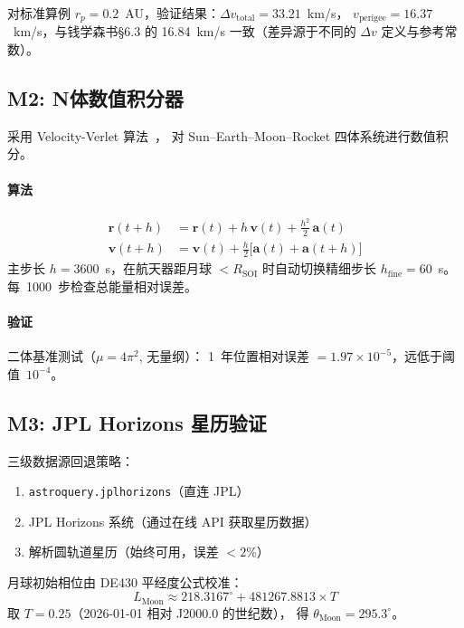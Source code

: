 \documentclass[a4paper,12pt]{article}
\begin{document}
对标准算例 $r_p = 0.2$~AU，验证结果：$\Delta v_{\mathrm{total}} = 33.21$~km/s，
$v_{\mathrm{perigee}} = 16.37$~km/s，与钱学森书\S6.3 的 16.84~km/s 一致（差异源于不同的
$\Delta v$ 定义与参考常数）。

\subsection{M2: N体数值积分器}\label{sec:m2}

采用 Velocity-Verlet 算法~\cite{verlet1967}，
对 Sun--Earth--Moon--Rocket 四体系统进行数值积分。

\paragraph{算法}
\begin{equation}\label{eq:verlet}
  \begin{aligned}
    \mathbf{r}(t+h) &= \mathbf{r}(t) + h\,\mathbf{v}(t) + \tfrac{h^2}{2}\,\mathbf{a}(t) \\
    \mathbf{v}(t+h) &= \mathbf{v}(t) + \tfrac{h}{2}\bigl[\mathbf{a}(t) + \mathbf{a}(t+h)\bigr]
  \end{aligned}
\end{equation}
主步长 $h = 3600$~s，在航天器距月球 $< R_{\mathrm{SOI}}$ 时自动切换精细步长
$h_{\mathrm{fine}} = 60$~s。
每~1000~步检查总能量相对误差。

\paragraph{验证}
二体基准测试（$\mu = 4\pi^2$, 无量纲）：
1~年位置相对误差 $= 1.97 \times 10^{-5}$，远低于阈值~$10^{-4}$。

\subsection{M3: JPL Horizons 星历验证}\label{sec:m3}

三级数据源回退策略：
\begin{enumerate}
  \item \texttt{astroquery.jplhorizons}（直连 JPL）
  \item JPL Horizons 系统（通过在线 API 获取星历数据）
  \item 解析圆轨道星历（始终可用，误差 $< 2\%$）
\end{enumerate}

月球初始相位由 DE430 平经度公式校准：
\begin{equation}
  L_{\mathrm{Moon}} \approx 218.3167^\circ + 481267.8813 \times T
\end{equation}
取 $T = 0.25$（2026-01-01 相对 J2000.0 的世纪数），
得 $\theta_{\mathrm{Moon}} = 295.3^\circ$。
\end{document}
